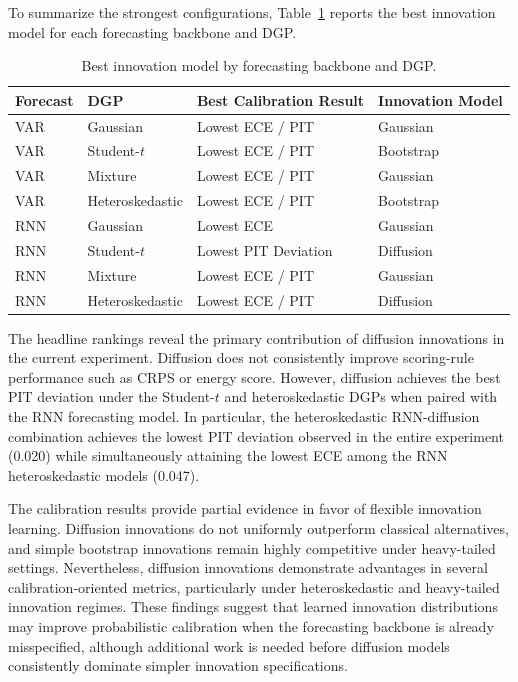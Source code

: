 \documentclass[11pt]{article}
\begin{document}
To summarize the strongest configurations, Table~\ref{tab:headline_rankings} reports the best innovation model for each forecasting backbone and DGP.

\begin{table}[H]
\centering
\caption{Best innovation model by forecasting backbone and DGP.}
\label{tab:headline_rankings}
\small
\begin{tabular}{llll}
\toprule
Forecast & DGP & Best Calibration Result & Innovation Model \\
\midrule
VAR & Gaussian & Lowest ECE / PIT & Gaussian \\
VAR & Student-$t$ & Lowest ECE / PIT & Bootstrap \\
VAR & Mixture & Lowest ECE / PIT & Gaussian \\
VAR & Heteroskedastic & Lowest ECE / PIT & Bootstrap \\
\midrule
RNN & Gaussian & Lowest ECE & Gaussian \\
RNN & Student-$t$ & Lowest PIT Deviation & Diffusion \\
RNN & Mixture & Lowest ECE / PIT & Gaussian \\
RNN & Heteroskedastic & Lowest ECE / PIT & Diffusion \\
\bottomrule
\end{tabular}
\end{table}

The headline rankings reveal the primary contribution of diffusion innovations in the current experiment. Diffusion does not consistently improve scoring-rule performance such as CRPS or energy score. However, diffusion achieves the best PIT deviation under the Student-$t$ and heteroskedastic DGPs when paired with the RNN forecasting model. In particular, the heteroskedastic RNN-diffusion combination achieves the lowest PIT deviation observed in the entire experiment (0.020) while simultaneously attaining the lowest ECE among the RNN heteroskedastic models (0.047).

The calibration results provide partial evidence in favor of flexible innovation learning. Diffusion innovations do not uniformly outperform classical alternatives, and simple bootstrap innovations remain highly competitive under heavy-tailed settings. Nevertheless, diffusion innovations demonstrate advantages in several calibration-oriented metrics, particularly under heteroskedastic and heavy-tailed innovation regimes. These findings suggest that learned innovation distributions may improve probabilistic calibration when the forecasting backbone is already misspecified, although additional work is needed before diffusion models consistently dominate simpler innovation specifications.
\end{document}
